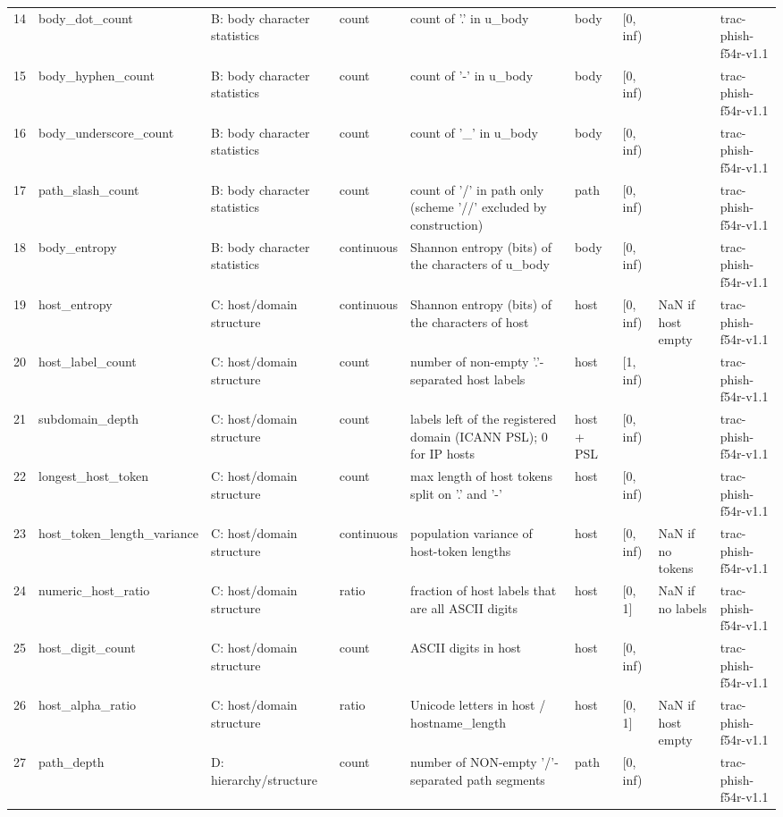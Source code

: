 \begin{tabular}{rllllllll}
14 & body\_dot\_count & B: body character statistics & count & count of '.' in u\_body & body & [0, inf) &  & trac-phish-f54r-v1.1 \\
15 & body\_hyphen\_count & B: body character statistics & count & count of '-' in u\_body & body & [0, inf) &  & trac-phish-f54r-v1.1 \\
16 & body\_underscore\_count & B: body character statistics & count & count of '\_' in u\_body & body & [0, inf) &  & trac-phish-f54r-v1.1 \\
17 & path\_slash\_count & B: body character statistics & count & count of '/' in path only (scheme '//' excluded by construction) & path & [0, inf) &  & trac-phish-f54r-v1.1 \\
18 & body\_entropy & B: body character statistics & continuous & Shannon entropy (bits) of the characters of u\_body & body & [0, inf) &  & trac-phish-f54r-v1.1 \\
19 & host\_entropy & C: host/domain structure & continuous & Shannon entropy (bits) of the characters of host & host & [0, inf) & NaN if host empty & trac-phish-f54r-v1.1 \\
20 & host\_label\_count & C: host/domain structure & count & number of non-empty '.'-separated host labels & host & [1, inf) &  & trac-phish-f54r-v1.1 \\
21 & subdomain\_depth & C: host/domain structure & count & labels left of the registered domain (ICANN PSL); 0 for IP hosts & host + PSL & [0, inf) &  & trac-phish-f54r-v1.1 \\
22 & longest\_host\_token & C: host/domain structure & count & max length of host tokens split on '.' and '-' & host & [0, inf) &  & trac-phish-f54r-v1.1 \\
23 & host\_token\_length\_variance & C: host/domain structure & continuous & population variance of host-token lengths & host & [0, inf) & NaN if no tokens & trac-phish-f54r-v1.1 \\
24 & numeric\_host\_ratio & C: host/domain structure & ratio & fraction of host labels that are all ASCII digits & host & [0, 1] & NaN if no labels & trac-phish-f54r-v1.1 \\
25 & host\_digit\_count & C: host/domain structure & count & ASCII digits in host & host & [0, inf) &  & trac-phish-f54r-v1.1 \\
26 & host\_alpha\_ratio & C: host/domain structure & ratio & Unicode letters in host / hostname\_length & host & [0, 1] & NaN if host empty & trac-phish-f54r-v1.1 \\
27 & path\_depth & D: hierarchy/structure & count & number of NON-empty '/'-separated path segments & path & [0, inf) &  & trac-phish-f54r-v1.1 \\

\end{tabular}
